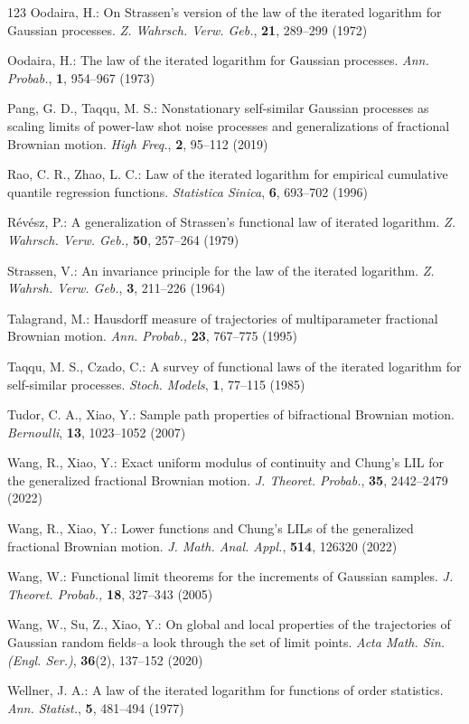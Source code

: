 \documentclass[11pt, reqno]{amsart}
\numberwithin{equation}{section}
\newcommand{\1}{{\bf 1}}
\newcommand{\2}{{\bf 2}}
\begin{document}
\begin{thebibliography}{123}
  Oodaira, H.: On Strassen's version of the law of the iterated logarithm for Gaussian processes.
{\it Z. Wahrsch. Verw. Geb.}, {\bf 21}, 289--299 (1972)

 Oodaira, H.: The law of the iterated logarithm for Gaussian processes. {\it Ann. Probab.}, {\bf 1}, 954--967 (1973)

 

  Pang, G. D.,    Taqqu, M. S.: Nonstationary self-similar Gaussian processes as scaling limits of power-law
shot noise processes and generalizations of fractional Brownian motion. {\it High Freq.}, {\bf2}, 95--112 (2019)

   Rao, C. R.,     Zhao, L. C.: Law of the iterated logarithm for empirical cumulative quantile regression functions. 
 {\it Statistica Sinica}, {\bf 6},  693--702 (1996)
 
  R\'ev\'esz, P.:  A generalization of Strassen's functional law of  iterated logarithm. {\it Z. Wahrsch. Verw. Geb.,}
 {\bf 50}, 257--264 (1979)

 

 Strassen, V.:  An invariance principle for the law of the iterated logarithm.
{\it Z. Wahrsh. Verw. Geb.}, {\bf 3}, 211--226 (1964)



  Talagrand, M.: Hausdorff measure of trajectories of multiparameter fractional Brownian motion.  {\it Ann. Probab.,}
{\bf 23}, 767--775 (1995)

 Taqqu, M. S.,      Czado, C.:  A survey of functional laws of the iterated logarithm for self-similar processes.
{\it Stoch. Models},  {\bf 1}, 77--115 (1985)


 Tudor,  C. A.,       Xiao, Y.: Sample path properties of bifractional Brownian motion. {\it Bernoulli},  {\bf 13}, 1023--1052  (2007)

  Wang, R.,    Xiao, Y.: Exact uniform modulus of continuity and Chung's LIL for the generalized fractional Brownian motion.
{\it J. Theoret. Probab.},   {\bf 35}, 2442--2479 (2022)

Wang, R.,    Xiao, Y.: Lower functions and Chung's LILs of the generalized fractional Brownian motion.
 {\it J. Math. Anal. Appl.},  {\bf 514}, 126320 (2022)
 
 
 Wang, W.: Functional limit theorems for the increments of Gaussian samples. {\it J. Theoret. Probab.,}
{\bf 18}, 327--343 (2005)

 Wang, W.,   Su, Z.,   Xiao, Y.:  On global and local properties of the trajectories of Gaussian random
fields--a look through the set of limit points. {\it Acta Math. Sin. (Engl. Ser.)},  {\bf36}(2), 137--152 (2020)


 Wellner, J. A.:  A law of the iterated logarithm for functions of order statistics. {\it Ann. Statist.},  {\bf 5},  481--494 (1977) 

 
\end{thebibliography}
 
    
\end{document}
